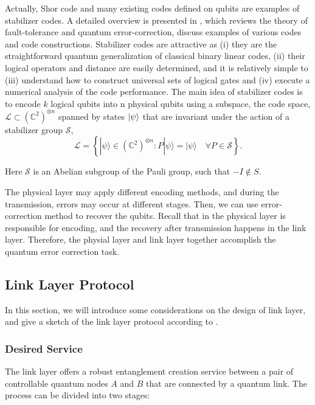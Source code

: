 \documentclass[10pt]{article}
\begin{document}
Actually, Shor code and many existing codes defined on qubits are examples of stabilizer codes. A detailed overview is presented in \cite{terhal2015quantum}, which reviews the theory of fault-tolerance and quantum error-correction, discuss
examples of various codes and code constructions. Stabilizer codes are attractive as (i) they are the straightforward quantum generalization of classical binary linear codes, (ii) their logical operators and distance are easily determined, and it is relatively simple to (iii) understand how to construct universal sets of logical gates and (iv) execute a numerical analysis of the code performance. The main idea of stabilizer codes is to encode $k$ logical qubits into n physical qubits using a subspace, the code space, $\mathcal L\subset (\mathbb{C}^2)^{\otimes n} $ spanned by states $\ket{\psi}$ that are
invariant under the action of a stabilizer group $\mathcal S$,
$$\mathcal{L}=\left\{|\psi\rangle \in\left(\mathbb{C}^{2}\right)^{\otimes n}: P|\psi\rangle=|\psi\rangle \quad \forall P \in \mathcal{S}\right\}.$$

Here $\mathcal S$ is an Abelian subgroup of the Pauli group, such that $-I\notin S$.

The physical layer may apply different encoding methods, and during the transmission, errors may occur at different stages. Then, we can use error-correction method to recover the qubits. Recall that in the physical layer is responsible for encoding, and the recovery after transmission happens in the link layer. Therefore, the physial layer and link layer together accomplish the quantum error correction task.

\subsection{Link Layer Protocol}
In this section, we will introduce some considerations on the design of link layer, and give a sketch of the link layer protocol according to \cite{dahlberg2019link}.

\subsubsection{Desired Service}

The link layer offers a robust entanglement creation service between a pair of controllable quantum nodes $A$ and $B$ that are connected by a quantum link. The process can be divided into two stages:
\end{document}
